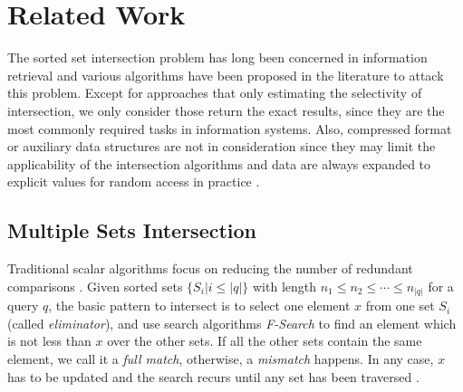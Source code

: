\documentclass[runningheads,a4paper]{llncs}
\begin{document}
\section{Related Work}\label{sec:related work}
The sorted set intersection problem has long been concerned in information retrieval and various algorithms have been proposed in the literature to attack this problem.
Except for approaches that only estimating the selectivity of intersection, we only consider those return the exact results, since they are the most commonly required tasks in information systems.
Also, compressed format or auxiliary data structures are not in consideration since they may limit the applicability of the intersection algorithms and data are always expanded to explicit values for random access in practice \cite{Culpepper2007Compact,Sanders2007Intersection}.
\subsection{Multiple Sets Intersection}
Traditional scalar algorithms focus on reducing the number of redundant comparisons \cite{Demaine2001Experiments,Barbay2006Faster,Inoue2014Faster,Schlegel2010Fast}.
Given sorted sets $ \{S_i|i\leqslant\lvert q \rvert\} $ with length $ n_1\leqslant n_2\leqslant\cdots\leqslant n_{\lvert q\rvert} $ for a query $ q $, the basic pattern to intersect is to select one element $ x $ from one set $ S_i $ (called \textit{eliminator}), and use search algorithms \textit{F-Search} to find an element which is not less than $ x $ over the other sets.
If all the other sets contain the same element, we call it a \textit{full match}, otherwise, a \textit{mismatch} happens.
In any case, $ x $ has to be updated and the search recurs until any set has been traversed \cite{culpepper2010efficient}.
\end{document}
